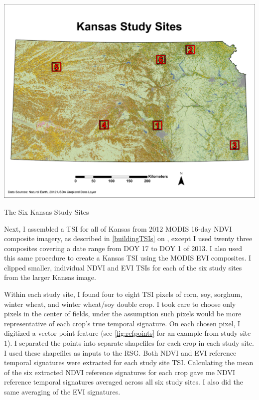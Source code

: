 \begin{ssfigure}
  \centering
  \includegraphics[width=\textwidth]{Graphics/Testing/STUDYSITES.pdf}
  \caption{The Six Kansas Study Sites}
  \label{fig:studysites}
\end{ssfigure}

Next, I assembled a TSI for all of Kansas from 2012 MODIS 16-day NDVI composite imagery, as described in \autoref{buildingTSIs} on , except I used twenty three composites covering a date range from DOY 17 to DOY 1 of 2013. I also used this same procedure to create a Kansas TSI using the MODIS EVI composites. I clipped smaller, individual NDVI and EVI TSIs for each of the six study sites from the larger Kansas image.

Within each study site, I found four to eight TSI pixels of corn, soy, sorghum, winter wheat, and winter wheat/soy double crop. I took care to choose only pixels in the center of fields, under the assumption such pixels would be more representative of each crop’s true temporal signature. On each chosen pixel, I digitized a vector point feature (see \autoref{fig:refpoints} for an example from study site 1). I separated the points into separate shapefiles for each crop in each study site. I used these shapefiles as inputs to the RSG. Both NDVI and EVI reference temporal signatures were extracted for each study site TSI. Calculating the mean of the six extracted NDVI reference signatures for each crop gave me NDVI reference temporal signatures averaged across all six study sites. I also did the same averaging of the EVI signatures.

